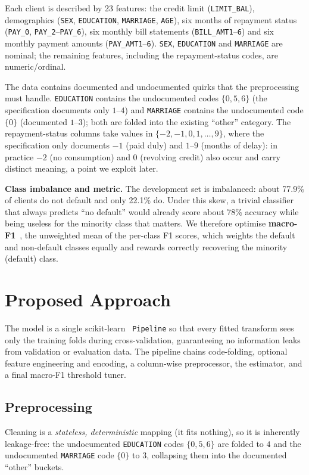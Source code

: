 \documentclass[conference]{IEEEtran}
\begin{document}
Each client is described by 23 features: the credit limit (\texttt{LIMIT\_BAL}),
demographics (\texttt{SEX}, \texttt{EDUCATION}, \texttt{MARRIAGE}, \texttt{AGE}),
six months of repayment status (\texttt{PAY\_0}, \texttt{PAY\_2}--\texttt{PAY\_6}),
six monthly bill statements (\texttt{BILL\_AMT1}--\texttt{6}) and six monthly
payment amounts (\texttt{PAY\_AMT1}--\texttt{6}). \texttt{SEX},
\texttt{EDUCATION} and \texttt{MARRIAGE} are nominal; the remaining features,
including the repayment-status codes, are numeric/ordinal.

The data contains documented and undocumented quirks that the preprocessing must
handle. \texttt{EDUCATION} contains the undocumented codes $\{0,5,6\}$ (the
specification documents only $1$--$4$) and \texttt{MARRIAGE} contains the
undocumented code $\{0\}$ (documented $1$--$3$); both are folded into the
existing ``other'' category. The repayment-status columns take values in
$\{-2,-1,0,1,\dots,9\}$, where the specification only documents $-1$ (paid duly)
and $1$--$9$ (months of delay): in practice $-2$ (no consumption) and $0$
(revolving credit) also occur and carry distinct meaning, a point we exploit
later.

\textbf{Class imbalance and metric.} The development set is imbalanced: about
77.9\% of clients do not default and only 22.1\% do. Under this skew, a trivial
classifier that always predicts ``no default'' would already score about 78\%
accuracy while being useless for the minority class that matters. We therefore
optimise \textbf{macro-F1}~\cite{hegarcia2009}, the unweighted mean of the
per-class F1 scores, which
weights the default and non-default classes equally and rewards correctly
recovering the minority (default) class.

\section{Proposed Approach}
The model is a single scikit-learn~\cite{sklearn} \texttt{Pipeline} so that every fitted
transform sees only the training folds during cross-validation, guaranteeing no
information leaks from validation or evaluation data. The pipeline chains
code-folding, optional feature engineering and encoding, a column-wise
preprocessor, the estimator, and a final macro-F1 threshold tuner.

\subsection{Preprocessing}
\label{sec:preprocessing}
Cleaning is a \emph{stateless, deterministic} mapping (it fits nothing), so it is
inherently leakage-free: the undocumented \texttt{EDUCATION} codes $\{0,5,6\}$
are folded to $4$ and the undocumented \texttt{MARRIAGE} code $\{0\}$ to $3$,
collapsing them into the documented ``other'' buckets.
\end{document}
